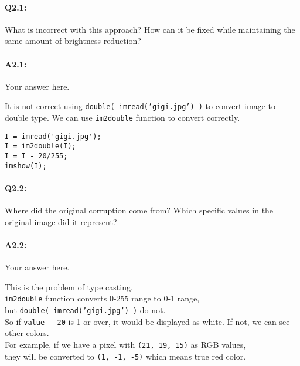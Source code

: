 \documentclass[11pt]{article}
\begin{document}
\paragraph{Q2.1:} What is incorrect with this approach? How can it be fixed while maintaining the same amount of brightness reduction?

\paragraph{A2.1:} Your answer here.

It is not correct using \texttt{double( imread('gigi.jpg') )} to convert image to double type. We can use \texttt{im2double} function to convert correctly.

\begin{lstlisting}[style=Matlab-editor]
I = imread('gigi.jpg');
I = im2double(I);
I = I - 20/255;
imshow(I);
\end{lstlisting}



\pagebreak
\paragraph{Q2.2:} Where did the original corruption come from? Which specific values in the original image did it represent?

\paragraph{A2.2:} Your answer here.

This is the problem of type casting.\\
\texttt{im2double} function converts 0-255 range to 0-1 range,\\but \texttt{double( imread('gigi.jpg') )} do not.\\
So if \texttt{value - 20} is 1 or over, it would be displayed as white. If not, we can see other colors. \\
For example, if we have a pixel with \texttt{(21, 19, 15)} as RGB values,\\they will be converted to \texttt{(1, -1, -5)} which means true red color.
\end{document}
